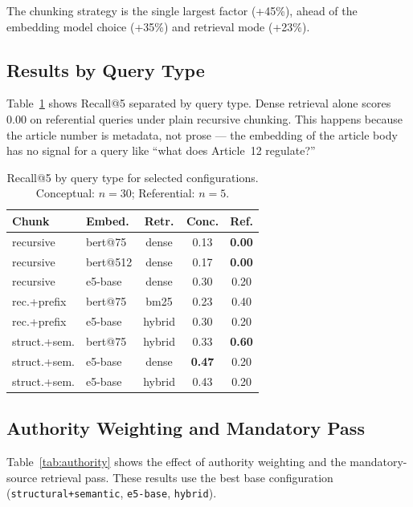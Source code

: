 \documentclass[11pt,a4paper,twocolumn]{article}
\begin{document}
The chunking strategy is the single largest factor (+45\%), ahead of the embedding model choice (+35\%) and retrieval mode (+23\%).

\subsection{Results by Query Type}

Table~\ref{tab:querytype} shows Recall@5 separated by query type. Dense retrieval alone scores 0.00 on referential queries under plain recursive chunking. This happens because the article number is metadata, not prose --- the embedding of the article body has no signal for a query like ``what does Article~12 regulate?''

\begin{table}[t]
\centering
\caption{Recall@5 by query type for selected configurations. Conceptual: $n{=}30$; Referential: $n{=}5$.}
\label{tab:querytype}
\small
\begin{tabular}{@{}llccc@{}}
\toprule
\textbf{Chunk} & \textbf{Embed.} & \textbf{Retr.} & \textbf{Conc.} & \textbf{Ref.} \\
\midrule
recursive    & bert@75  & dense  & 0.13 & \textbf{0.00} \\
recursive    & bert@512 & dense  & 0.17 & \textbf{0.00} \\
recursive    & e5-base  & dense  & 0.30 & 0.20 \\
rec.+prefix  & bert@75  & bm25   & 0.23 & 0.40 \\
rec.+prefix  & e5-base  & hybrid & 0.30 & 0.20 \\
struct.+sem. & bert@75  & hybrid & 0.33 & \textbf{0.60} \\
struct.+sem. & e5-base  & dense  & \textbf{0.47} & 0.20 \\
struct.+sem. & e5-base  & hybrid & 0.43 & 0.20 \\
\bottomrule
\end{tabular}
\end{table}

\subsection{Authority Weighting and Mandatory Pass}
\label{subsec:auth_results}

Table~\ref{tab:authority} shows the effect of authority weighting and the mandatory-source retrieval pass. These results use the best base configuration (\texttt{structural+semantic}, \texttt{e5-base}, \texttt{hybrid}).
\end{document}
